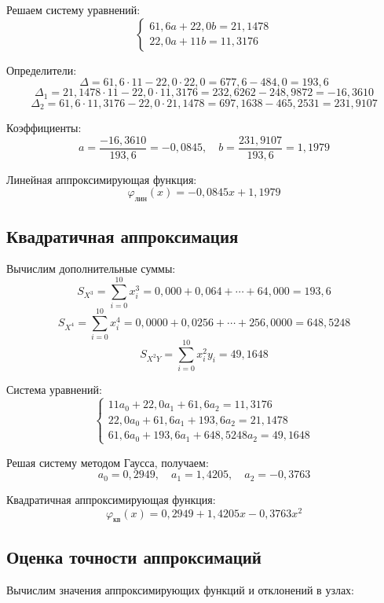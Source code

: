 Решаем систему уравнений:
\[
\begin{cases}
61{,}6 a + 22{,}0 b = 21{,}1478 \\
22{,}0 a + 11 b = 11{,}3176
\end{cases}
\]

Определители:
\[
\Delta = 61{,}6 \cdot 11 - 22{,}0 \cdot 22{,}0 = 677{,}6 - 484{,}0 = 193{,}6
\]
\[
\Delta_1 = 21{,}1478 \cdot 11 - 22{,}0 \cdot 11{,}3176 = 232{,}6262 - 248{,}9872 = -16{,}3610
\]
\[
\Delta_2 = 61{,}6 \cdot 11{,}3176 - 22{,}0 \cdot 21{,}1478 = 697{,}1638 - 465{,}2531 = 231{,}9107
\]

Коэффициенты:
\[
a = \frac{-16{,}3610}{193{,}6} = -0{,}0845,\quad
b = \frac{231{,}9107}{193{,}6} = 1{,}1979
\]

Линейная аппроксимирующая функция:
\[
\boxed{\varphi_{\text{лин}}(x) = -0{,}0845x + 1{,}1979}
\]

\subsection{Квадратичная аппроксимация}

Вычислим дополнительные суммы:
\[
S_{X^3} = \sum_{i=0}^{10} x_i^3 = 0{,}000 + 0{,}064 + \cdots + 64{,}000 = 193{,}6
\]
\[
S_{X^4} = \sum_{i=0}^{10} x_i^4 = 0{,}0000 + 0{,}0256 + \cdots + 256{,}0000 = 648{,}5248
\]
\[
S_{X^2Y} = \sum_{i=0}^{10} x_i^2 y_i = 49{,}1648
\]

Система уравнений:
\[
\begin{cases}
11 a_0 + 22{,}0 a_1 + 61{,}6 a_2 = 11{,}3176 \\
22{,}0 a_0 + 61{,}6 a_1 + 193{,}6 a_2 = 21{,}1478 \\
61{,}6 a_0 + 193{,}6 a_1 + 648{,}5248 a_2 = 49{,}1648
\end{cases}
\]

Решая систему методом Гаусса, получаем:
\[
a_0 = 0{,}2949,\quad a_1 = 1{,}4205,\quad a_2 = -0{,}3763
\]

Квадратичная аппроксимирующая функция:
\[
\boxed{\varphi_{\text{кв}}(x) = 0{,}2949 + 1{,}4205x - 0{,}3763x^2}
\]

\subsection{Оценка точности аппроксимаций}

Вычислим значения аппроксимирующих функций и отклонений в узлах:

